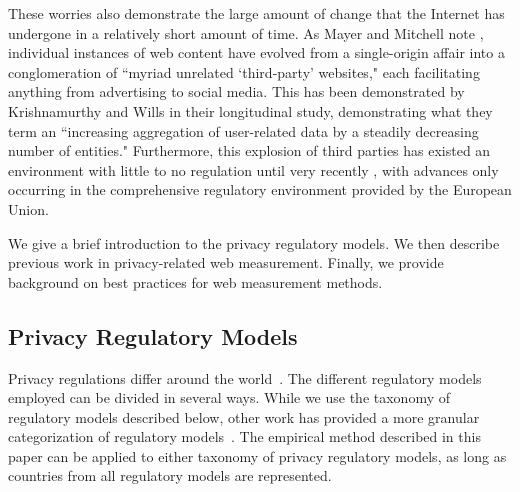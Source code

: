 \documentclass[conference]{IEEEtran}
\begin{document}
These worries also demonstrate the large amount of change that the Internet has undergone in a relatively short amount of time. As Mayer and Mitchell note \cite{Mayer_Mitchell}, individual instances of web content have evolved from a single-origin affair into a conglomeration of  ``myriad unrelated  `third-party' websites," each facilitating anything from advertising to social media. 
This has been demonstrated by Krishnamurthy and Wills \cite{Krishnamurthy} in their longitudinal study, demonstrating what they term an ``increasing aggregation of user-related data by a steadily decreasing number of entities."
Furthermore, this explosion of third parties has existed an environment with little to no regulation until very recently \cite{Mayer_Mitchell}, with advances only occurring in the comprehensive regulatory environment provided by the European Union.  

We give a brief introduction to the privacy regulatory models.  We then describe previous work in privacy-related web measurement. Finally, we provide background on best practices for web measurement methods.

\subsection{Privacy Regulatory Models}
Privacy regulations differ around the world~\cite{flaherty1992protecting,madsen1992handbook}. The different regulatory models employed can be divided in several ways.  While we use the taxonomy of regulatory models described below, other work has provided a more granular categorization of regulatory models~\cite{Milberg:1995:VPI:219663.219683, madsen1992handbook}.  The empirical method described in this paper can be applied to either taxonomy of privacy regulatory models, as long as countries from all regulatory models are represented.
\end{document}
